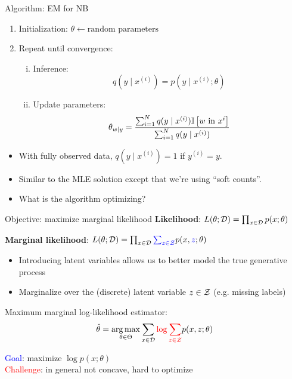 \documentclass[usenames,dvipsnames,notes,11pt,aspectratio=169]{beamer}
\newcommand{\pdfnote}[1]{}
\begin{document}
\begin{frame}
    {Algorithm: EM for NB}
    \begin{enumerate}
        \item Initialization: $\theta \leftarrow \text{random parameters}$
        \item Repeat until convergence:
            \begin{enumerate}[(i)]
                \item Inference: $$
                    q(y\mid x^{(i)}) = p(y\mid x^{(i)};\theta)$$
                \item Update parameters: $$
                    \theta_{w\mid y} = \frac{\sum_{i=1}^N q(y\mid x^{(i)}) \mathbb{I}\left[ w \text{ in } x^{i} \right]}
                    {\sum_{i=1}^N q(y\mid x^{(i)})}
                    $$
            \end{enumerate}
    \end{enumerate}
    \begin{itemize}
        \item With fully observed data, $q(y\mid x^{(i)}) = 1$ if $y^{(i)} = y$.
        \item Similar to the MLE solution except that we're using ``soft counts''.
        \item What is the algorithm optimizing?
    \end{itemize}
    \pdfnote{Now let's derive the algorithm in a top-down way, starting from the objective.}
\end{frame}

\begin{frame}
    {Objective: maximize marginal likelihood}
    \textbf{Likelihood}: $L(\theta;\mathcal{D}) = \prod_{x\in\mathcal{D}} p(x;\theta)$

    \textbf{Marginal likelihood}: $L(\theta;\mathcal{D}) = \prod_{x\in\mathcal{D}} {\color{blue}\sum_{z\in\mathcal{Z}}}p(x,{\color{blue}z};\theta)$\\
    \begin{itemize}
        \item Introducing latent variables allows us to better model the true generative process 
        \item Marginalize over the (discrete) latent variable $z\in\mathcal{Z}$ (e.g. missing labels)
    \end{itemize}

    Maximum marginal log-likelihood estimator:
    $$
    \hat{\theta} = \operatorname*{arg\,max}_{\theta\in\Theta} \sum_{x\in\mathcal{D}} {\color{red}\log \sum_{z\in\mathcal{Z}}} p(x,z;\theta)
    $$

    \textcolor{blue}{Goal}: maximize $\log p(x;\theta)$\\
    \textcolor{red}{Challenge}: in general not concave, hard to optimize
\end{frame}
\end{document}

